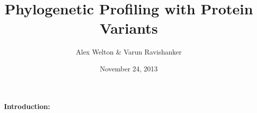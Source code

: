 \documentclass[11pt, oneside]{article}
\title{Phylogenetic Profiling with Protein Variants}
\author{Alex Welton & Varun Ravishanker}
\date{November 24, 2013}
\begin{document}
\maketitle
\pagebreak

\paragraph
{\bfseries Introduction:}
\end{document}
